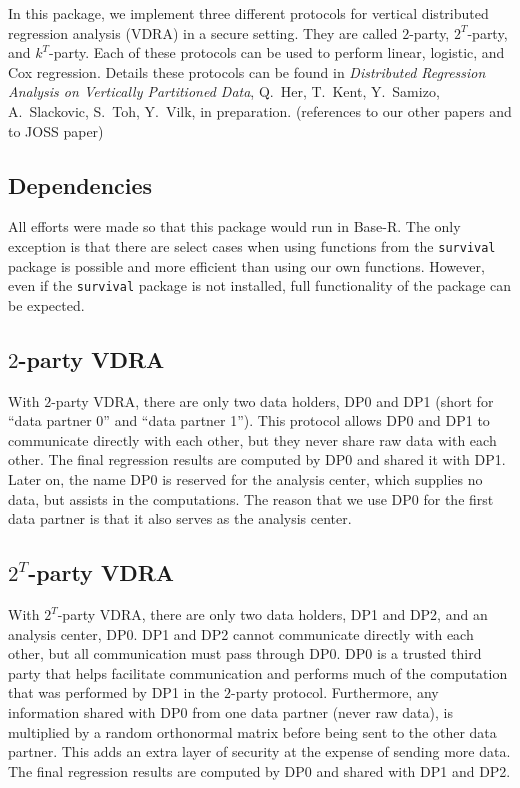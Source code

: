 \documentclass[12]{article}
\begin{document}
In this package, we implement three different protocols for vertical distributed regression analysis (VDRA) in a secure setting.  They are called $2$-party, $2^T$-party, and $k^T$-party.  Each of these protocols can be used to perform linear, logistic, and Cox regression.  Details these protocols can be found in \textit{Distributed Regression Analysis on Vertically Partitioned Data}, Q.\ Her, T.\ Kent, Y.\ Samizo, A.\ Slackovic, S.\ Toh, Y.\ Vilk, in preparation.  (references to our other papers and to JOSS paper)

\subsection{Dependencies}

All efforts were made so that this package would run in Base-R.  The only exception is that there are select cases when using functions from the \verb"survival" package is possible and more efficient than using our own functions.  However, even if the \verb"survival" package is not installed, full functionality of the package can be expected.

\subsection{$2$-party VDRA}

With $2$-party VDRA, there are only two data holders, DP0 and DP1 (short for ``data partner 0'' and ``data partner 1'').  This protocol allows DP0 and DP1 to communicate directly with each other, but they never share raw data with each other.  The final regression results are computed by DP0 and shared it with DP1.  Later on, the name DP0 is reserved for the analysis center, which supplies no data, but assists in the computations.  The reason that we use DP0 for the first data partner is that it also serves as the analysis center.

\subsection{$2^T$-party VDRA}

With $2^T$-party VDRA, there are only two data holders, DP1 and DP2, and an analysis center, DP0.  DP1 and DP2 cannot communicate directly with each other, but all communication must pass through DP0.  DP0 is a trusted third party that helps facilitate communication and performs much of the computation that was performed by DP1 in the $2$-party protocol.  Furthermore, any information shared with DP0 from one data partner (never raw data), is multiplied by a random orthonormal matrix before being sent to the other data partner.  This adds an extra layer of security at the expense of sending more data.  The final regression results are computed by DP0 and shared with DP1 and DP2.
\end{document}
